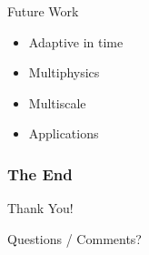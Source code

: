 \documentclass[]{beamer}
\begin{document}
\begin{frame}{Future Work}

  \begin{itemize}
  \item Adaptive in time
  \item Multiphysics
  \item Multiscale
  \item Applications
  \end{itemize}

\end{frame}


\begin{frame}
  \frametitle{The End}
  \begin{center}
    Thank You!

    Questions / Comments?
  \end{center}
\end{frame}
\end{document}
